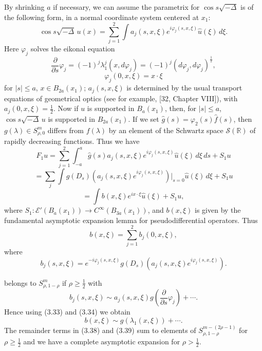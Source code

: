 By shrinking $a$ if necessary, we can assume the parametrix for $\cos s\sqrt{-\Delta}$ is of the following form, in a normal coordinate system centered at $x_1$:
\begin{equation}\tag{3.32}
\cos s\sqrt{-\Delta}\,u(x)=\sum_{j=1}^{2}\int a_j(s,x,\xi)e^{i\varphi_j(s,x,\xi)}\hat u(\xi)\,d\xi.
\end{equation}
Here $\varphi_j$ solves the eikonal equation
\begin{equation}\tag{3.33}
\frac{\partial}{\partial s}\varphi_j = (-1)^j\lambda_1^j(x,d\varphi_j)=(-1)^j(d\varphi_j,d\varphi_j)^{\frac12},
\end{equation}
\begin{equation}\tag{3.34}
\varphi_j(0,x,\xi)=x\cdot \xi
\end{equation}
for $|s|\le a$, $x\in B_{2a}(x_1)$; $a_j(s,x,\xi)$ is determined by the usual transport equations of geometrical optics (see for example, [32, Chapter VIII]), with $a_j(0,x,\xi)=\frac12$. Now if $u$ is supported in $B_a(x_1)$, then, for $|s|\le a$, $\cos s\sqrt{-\Delta}\,u$ is supported in $B_{2a}(x_1)$. If we set $\hat g(s)=\varphi_2(s)\hat f(s)$, then $g(\lambda)\in S^{m}_{\rho,0}$ differs from $f(\lambda)$ by an element of the Schwartz space $\mathcal S(\mathbb R)$ of rapidly decreasing functions. Thus we have
\begin{equation*}
F_1u=\sum_{j=1}^{2}\int_{-a}^{a}\hat g(s)a_j(s,x,\xi)e^{i\varphi_j(s,x,\xi)}\hat u(\xi)\,d\xi\,ds+S_1u
\end{equation*}
\begin{equation}\tag{3.35}
=\sum_j\int g(D_s)\!\left(a_j(s,x,\xi)e^{i\varphi_j(s,x,\xi)}\right)\Big|_{s=0}\hat u(\xi)\,d\xi+S_1u
\end{equation}
\begin{equation*}
=\int b(x,\xi)e^{ix\cdot \xi}\hat u(\xi)+S_1u,
\end{equation*}
where $S_1:\mathcal E'(B_a(x_1))\to C^\infty(B_{3a}(x_1))$, and $b(x,\xi)$ is given by the fundamental asymptotic expansion lemma for pseudodifferential operators. Thus
\begin{equation}\tag{3.36}
b(x,\xi)=\sum_{j=1}^{2}b_j(0,x,\xi),
\end{equation}
where
\begin{equation}\tag{3.37}
b_j(s,x,\xi)=e^{-i\varphi_j(s,x,\xi)}g(D_s)\!\left(a_j(s,x,\xi)e^{i\varphi_j(s,x,\xi)}\right).
\end{equation}

belongs to $S^m_{\rho,1-\rho}$ if $\rho \ge \frac12$ with
\begin{equation}\tag{3.38}
b_j(s,x,\xi)\sim a_j(s,x,\xi)g\!\left(\frac{\partial}{\partial s}\varphi_j\right)+\cdots.
\end{equation}
Hence using (3.33) and (3.34) we obtain
\begin{equation}\tag{3.39}
b(x,\xi)\sim g(\lambda_1(x,\xi))+\cdots.
\end{equation}
The remainder terms in (3.38) and (3.39) sum to elements of $S^{m-(2\rho-1)}_{\rho,1-\rho}$ for $\rho \ge \frac12$ and we have a complete asymptotic expansion for $\rho>\frac12$.

